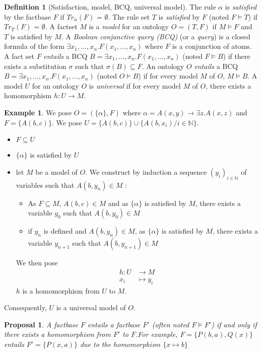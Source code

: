 \documentclass{article}
\newtheorem{proposal}{Proposal}[section]
\theoremstyle{definition}
\newtheorem{definition}{Definition}[section]
\newtheorem{example}{Example}[section]
\theoremstyle{remark}
\def \N {\mathbb N}
\begin{document}
\begin{definition}[Satisfaction, model, BCQ, universal model]
The rule $\alpha$ is \emph{satisfied} by the factbase $F$ if $Tr_{\alpha}(F)$ = $\emptyset$. The rule set $T$ is \emph{satisfied} by $F$ (noted $F \models T$) if $Tr_{T}(F)$ = $\emptyset$. A factset $M$ is a \emph{model} for an ontology $O = (T,F)$ if $M \models F$ and $T$ is satisfied by $M$. A \emph{Boolean conjunctive query (BCQ)} (or a \emph{query}) is a closed formula of the form $\exists x_1,...,x_n. F(x_1,...,x_n)$ where $F$ is a conjunction of atoms. A fact set $F$ \emph{entails} a BCQ $B = \exists x_1,...,x_n.F(x_1,...,x_n)$ (noted $F \vDash B$) if there exists a substitution $\sigma$ such that $\sigma(B) \subseteq F$. An ontology $O$ \emph{entails} a BCQ $B = \exists x_1,...,x_n.F(x_1,...,x_n)$ (noted $O \vDash B$) if for every model $M$ of $O$, $M \vDash B$. A model $U$ for an ontology $O$ is \emph{universal} if for
every model $M$ of $O$, there exists a homomorphism $h : U \to M$.
\end{definition}

\begin{example} We pose $O = (\{\alpha\},F)$ where $\alpha = A(x,y) \rightarrow \exists z.A(x,z)$ and $F = \{A(b,c)\}$. We pose $U = \{A(b,c)\}\cup \{A(b,x_i)/ i \in \N\}$.
\begin{itemize}
\item $F \subseteq U$
\item $\{\alpha\}$ is satisfied by $U$
\item let $M$ be a model of $O$. We construct by induction a sequence $(y_i)_{i \in \N}$ of variables such that $A(b,y_n) \in M$ : 
\begin{itemize}
\item As $F \subseteq M$, $A(b,c) \in M$ and as $\{\alpha\}$ is satisfied by $M$, there exists a variable $y_0$ such that $A(b,y_0) \in M$
\item if $y_n$ is defined and $A(b,y_n) \in M$, as $\{\alpha\}$ is satisfied by $M$, there exists a variable $y_{n+1}$ such that $A(b,y_{n+1}) \in M$
\end{itemize}
We then pose 
\begin{align*}
h:U &\to M\\
x_i &\mapsto y_i
\end{align*}
$h$ is a homomorphism from $U$ to $M$.
\end{itemize}
Consequently, $U$ is a universal model of $O$.
\end{example}

\begin{proposal}
A factbase $F$ \emph{entails} a factbase $F'$ (often noted $F \models F'$) if and only if there exists a homomorphism from $F'$ to $F$.For example, $F = \{P(b,a),Q(x)\}$ entails $F' = \{P(x,a)\}$ due to the homomorphism $\{x \mapsto b\}$ 
\end{proposal}
\end{document}
